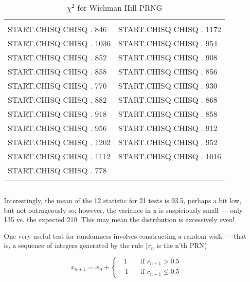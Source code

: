 \begin{table}
    \caption{$\chi^2$ for Wichman-Hill PRNG}
        \setlength{\tabcolsep}{20pt}
        \begin{tabular}{|ll|}
            \hline & \\
            START.CHISQ CHISQ . 846   &  START.CHISQ CHISQ . 1172  \\ 
            START.CHISQ CHISQ . 1036  &  START.CHISQ CHISQ . 954   \\
            START.CHISQ CHISQ . 852   &  START.CHISQ CHISQ . 908   \\
            START.CHISQ CHISQ . 858   &  START.CHISQ CHISQ . 856   \\
            START.CHISQ CHISQ . 770   &  START.CHISQ CHISQ . 930   \\
            START.CHISQ CHISQ . 882   &  START.CHISQ CHISQ . 868   \\
            START.CHISQ CHISQ . 918   &  START.CHISQ CHISQ . 858   \\
            START.CHISQ CHISQ . 956   &  START.CHISQ CHISQ . 912   \\
            START.CHISQ CHISQ . 1202  &  START.CHISQ CHISQ . 952   \\
            START.CHISQ CHISQ . 1112  &  START.CHISQ CHISQ . 1016  \\
            START.CHISQ CHISQ . 778   & \\
            & \\
            \hline
        \end{tabular} 
\end{table}

\begin{verbatim}
\end{verbatim} 
 
Interestingly, the mean of the 12 statistic for 21 tests is 93.5,
perhaps a bit low, but not outrageously so; however, the variance
in x is suspiciously small — only 135 vs. the expected 210. This
may mean the distribution is excessively even!

One very useful test for randomness involves constructing a
random walk — that is, a sequence of integers generated by the
rule ($r_n$ is the n'th PRN)

\begin{equation}
x_{n+1}=x_n+
\begin{cases}
    \;\; 1 & \quad \text{if } r_{n+1} > 0.5 \\
    -1 & \quad \text{if }  r_{n+1} \leq 0.5
    \end{cases}
\end{equation}

